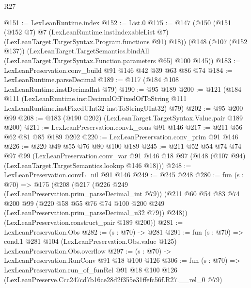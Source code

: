 \begin{lexlean}{R27}
\begin{coremodule}
@151 := LexLeanRuntime.index
@152 := List.{0}
@175 := @147
    (@150
      (@151
        (@152 @7)
        @7
        (LexLeanRuntime.instIndexableList @7)
        (LexLeanTarget.TargetSyntax.Program.functions @91)
        @18))
    (@148
      (@107 (@152 @137))
      (LexLeanTarget.TargetSemantics.bindAll
        (LexLeanTarget.TargetSyntax.Function.parameters @65)
        @100
        @145))
@183 := LexLeanPreservation.conv_build @91 @146 @42 @39 @63 @86 @74
@184 := LexLeanRuntime.parseDecimal
@189 := @117 (@184 @108 LexLeanRuntime.instDecimalInt @79)
@190 := @95 @189
@200 := @121
    (@184
      @111
      (LexLeanRuntime.instDecimalOfFixedOfToString
        @111
        LexLeanRuntime.instFixedUInt32
        instToStringUInt32)
      @79)
@202 := @95 @200 @99
@208 := @183 (@190 @202) (LexLeanTarget.TargetSyntax.Value.pair @189 @200)
@211 := LexLeanPreservation.convL_cons @91 @146
@217 := @211 @56 @62 @81 @85 @189 @202
@220 := LexLeanPreservation.conv_prim @91 @146
@226 := @220 @49 @55 @76 @80 @100 @189
@245 := @211
    @52
    @54
    @74
    @74
    @97
    @99
    (LexLeanPreservation.conv_var
      @91
      @146
      @18
      @97
      (@148 (@107 @94) (LexLeanTarget.TargetSemantics.lookup @146 @18)))
@248 := LexLeanPreservation.convL_nil @91 @146
@249 := @245 @248
@280 := fun (s : @70) =>
  @175
    (@208
      (@217
        (@226 @249 (LexLeanPreservation.prim_parseDecimal_int @79))
        (@211
          @60
          @54
          @83
          @74
          @200
          @99
          (@220 @58 @55 @76 @74 @100 @200 @249 (LexLeanPreservation.prim_parseDecimal_u32 @79))
          @248))
      (LexLeanPreservation.construct_pair @189 @200))
@281 := LexLeanPreservation.Obs
@282 := (s : @70) -> @281
@291 := fun (s : @70) =>
  cond.{1} @281 @104 (LexLeanPreservation.Obs.value @125) LexLeanPreservation.Obs.overflow
@297 := (s : @70) -> LexLeanPreservation.RunConv @91 @18 @100 @126
@306 := fun (s : @70) =>
  LexLeanPreservation.run_of_funRel
    @91
    @18
    @100
    @126
    (LexLeanPreserve.Ccc247cd7b16ce28d2f355e31ffefc56f.R27.__rel_0 @79)
\end{coremodule}
\end{lexlean}
